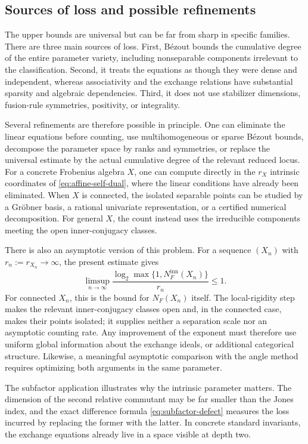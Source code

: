 \documentclass[11pt]{amsart}
\theoremstyle{definition}
\theoremstyle{remark}
\begin{document}
\subsection{Sources of loss and possible refinements}

The upper bounds are universal but can be far from sharp in specific
families.  There are three main sources of loss.  First, B\'ezout bounds the cumulative degree of
the entire parameter variety, including nonseparable components irrelevant
to the classification.  Second, it treats the equations as though they were
dense and independent, whereas associativity and the exchange relations have
substantial sparsity and algebraic dependencies.  Third, it does not use
stabilizer dimensions, fusion-rule symmetries, positivity, or integrality.

Several refinements are therefore possible in principle.  One can eliminate
the linear equations before counting, use multihomogeneous or sparse
B\'ezout bounds, decompose the parameter space by ranks and symmetries, or
replace the universal estimate by the actual cumulative degree of the
relevant reduced locus.  For a concrete Frobenius algebra $X$, one can compute
directly in the $r_X$ intrinsic coordinates of
\eqref{eq:affine-self-dual}, where the linear conditions have already been
eliminated.  When $X$ is connected, the isolated separable points can be
studied by a Gr\"obner basis, a rational univariate representation, or a
certified numerical decomposition.  For general $X$, the count instead
uses the irreducible components meeting the open inner-conjugacy classes.

There is also an asymptotic version of this problem.  For a sequence $(X_n)$
with $r_n:=r_{X_n}\to\infty$, the present estimate gives
\[
 \limsup_{n\to\infty}
 \frac{\log_2\max\{1,N_F^{\mathrm{inn}}(X_n)\}}{r_n}\leq1.
\]
For connected $X_n$, this is the bound for $N_F(X_n)$ itself.  The
local-rigidity step makes the relevant inner-conjugacy classes open and,
in the connected case, makes their points isolated; it supplies neither a
separation scale nor an asymptotic counting rate.  Any improvement of the exponent must therefore use uniform global
information about the exchange ideals, or additional categorical structure.
Likewise, a meaningful asymptotic comparison with the angle method requires
optimizing both arguments in the same parameter.

The subfactor application illustrates why the intrinsic parameter matters.
The dimension of the second relative commutant may be far smaller than the
Jones index, and the exact difference formula \eqref{eq:subfactor-defect}
measures the loss incurred by replacing the former with the latter.  In
concrete standard invariants, the exchange equations already live in a space
visible at depth two.
\end{document}
